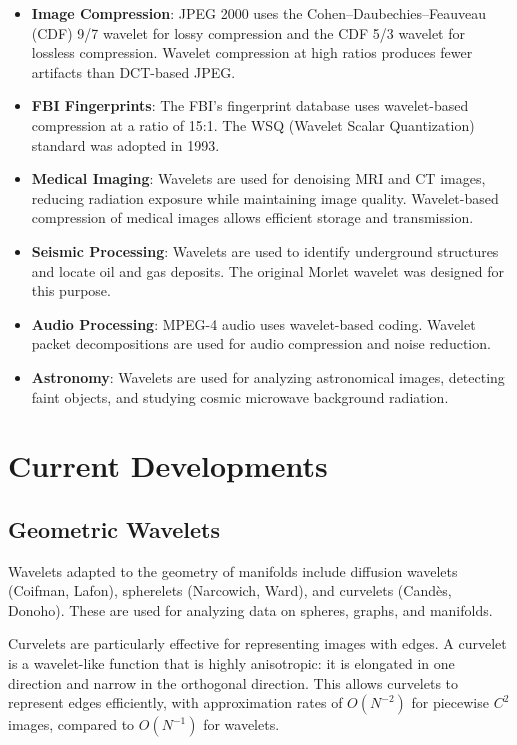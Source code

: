 \begin{itemize}
\item \textbf{Image Compression}: JPEG 2000 uses the Cohen--Daubechies--Feauveau (CDF) 9/7 wavelet for lossy compression and the CDF 5/3 wavelet for lossless compression. Wavelet compression at high ratios produces fewer artifacts than DCT-based JPEG.
\item \textbf{FBI Fingerprints}: The FBI's fingerprint database uses wavelet-based compression at a ratio of 15:1. The WSQ (Wavelet Scalar Quantization) standard was adopted in 1993.
\item \textbf{Medical Imaging}: Wavelets are used for denoising MRI and CT images, reducing radiation exposure while maintaining image quality. Wavelet-based compression of medical images allows efficient storage and transmission.
\item \textbf{Seismic Processing}: Wavelets are used to identify underground structures and locate oil and gas deposits. The original Morlet wavelet was designed for this purpose.
\item \textbf{Audio Processing}: MPEG-4 audio uses wavelet-based coding. Wavelet packet decompositions are used for audio compression and noise reduction.
\item \textbf{Astronomy}: Wavelets are used for analyzing astronomical images, detecting faint objects, and studying cosmic microwave background radiation.
\end{itemize}

\section{Current Developments}

\subsection{Geometric Wavelets}

Wavelets adapted to the geometry of manifolds include diffusion wavelets (Coifman, Lafon), spherelets (Narcowich, Ward), and curvelets (Cand\`es, Donoho). These are used for analyzing data on spheres, graphs, and manifolds.

Curvelets are particularly effective for representing images with edges. A curvelet is a wavelet-like function that is highly anisotropic: it is elongated in one direction and narrow in the orthogonal direction. This allows curvelets to represent edges efficiently, with approximation rates of $O(N^{-2})$ for piecewise $C^2$ images, compared to $O(N^{-1})$ for wavelets.

